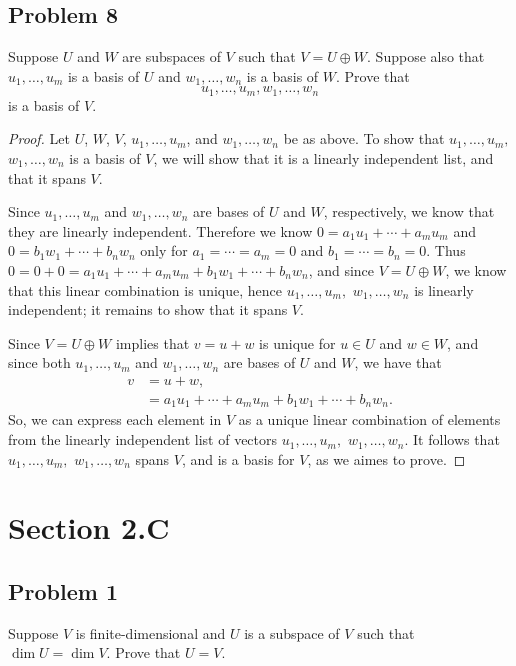 \documentclass[letterpaper, 12pt]{amsart}
\theoremstyle{definition}  %
\begin{document}
		\subsection*{Problem 8}
		Suppose $U$ and $W$ are subspaces of $V$ such that $V = U \oplus W$. 
		Suppose also that $u_{1}, \dots, u_{m}$ is a basis of $U$ and $w_{1}, \dots, w_{n}$ is a basis of $W$. 
		Prove that $$ u_{1}, \dots, u_{m}, w_{1}, \dots, w_{n} $$ is a basis of $V$.

		\begin{proof}
		Let $U$, $W$, $V$, $u_{1}, \dots, u_{m}$, and $w_{1}, \dots, w_{n}$ be as above.
		To show that $u_{1}, \dots, u_{m},$ $w_{1}, \dots, w_{n}$ is a basis of $V$, we will show that it is a linearly independent list, and that it spans $V$.

		Since $u_{1}, \dots, u_{m}$ and $w_{1}, \dots, w_{n}$ are bases of $U$ and $W$, respectively, we know that they are linearly independent.
		Therefore we know $0 = a_{1}u_{1} + \cdots + a_{m}u_{m}$ and $0 = b_{1}w_{1} + \cdots + b_{n}w_{n}$ only for $a_{1} = \cdots = a_{m} = 0$ and $b_{1} = \cdots = b_{n} = 0$.
		Thus $0 = 0 + 0 = a_{1}u_{1} + \cdots + a_{m}u_{m} + b_{1}w_{1} + \cdots + b_{n}w_{n}$, and since $V = U \oplus W$, we know that this linear combination is unique, hence $u_{1}, \dots, u_{m},$ $w_{1}, \dots, w_{n}$ is linearly independent; it remains to show that it spans $V$.

		Since $V = U \oplus W$ implies that $v = u + w$ is unique for $u \in U$ and $w \in W$, and since both $u_{1}, \dots, u_{m}$ and $w_{1}, \dots, w_{n}$ are bases of $U$ and $W$, we have that 
			\begin{align*}
				v &= u + w, \\
				&= a_{1}u_{1} + \cdots + a_{m}u_{m} + b_{1}w_{1} + \cdots + b_{n}w_{n}.
			\end{align*}
		So, we can express each element in $V$ as a unique linear combination of elements from the linearly independent list of vectors $u_{1}, \dots, u_{m},$ $w_{1}, \dots, w_{n}$.
		It follows that $u_{1}, \dots, u_{m},$ $w_{1}, \dots, w_{n}$ spans $V$, and is a basis for $V$, as we aimes to prove.
		\end{proof}

	\section*{Section 2.C}
		\subsection*{Problem 1}
		Suppose $V$ is finite-dimensional and $U$ is a subspace of $V$ such that $\dim U = \dim V$. 
		Prove that $U = V$.
\end{document}
